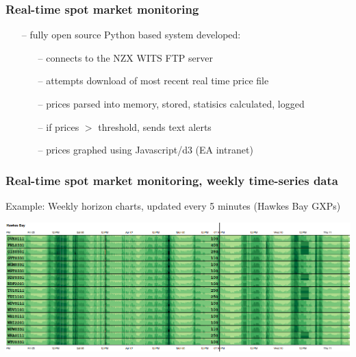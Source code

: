 \documentclass[aspectratio=169]{beamer}
\begin{document}
%

\begin{frame}[fragile]
  \frametitle{Real-time spot market monitoring}

\begin{itemize}
   \item[--] fully open source Python based system developed:
   \begin{itemize}
       \item[--] connects to the NZX WITS FTP server
       \item[--] attempts download of most recent real time price file 
       \item[--] prices parsed into memory, stored, statisics calculated, logged
       \item[--] if prices $>$ threshold, sends text alerts
       \item[--] prices graphed using Javascript/d3 (EA intranet)
       
   \end{itemize}
\end{itemize}

\end{frame}

\frame
{\frametitle{Real-time spot market monitoring, weekly time-series data}

Example: Weekly horizon charts, updated every 5 minutes (Hawkes Bay GXPs)
\begin{center}
\includegraphics[width=14.5cm]{./notebooks/rtpm2.png} 
\end{center}
}
\end{document}
